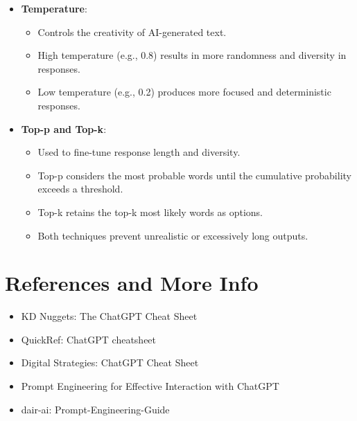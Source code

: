 \begin{itemize}
\itemsep-0.25em %
\item \textbf{Temperature}:
	\begin{itemize}
	\item Controls the creativity of AI-generated text.
	\item High temperature (e.g., 0.8) results in more randomness and diversity in responses.
	\item Low temperature (e.g., 0.2) produces more focused and deterministic responses.
	\end{itemize}
\item \textbf{Top-p and Top-k}:
	\begin{itemize}
	\item Used to fine-tune response length and diversity.
	\item Top-p considers the most probable words until the cumulative probability exceeds a threshold.
	\item Top-k retains the top-k most likely words as options.
	\item Both techniques prevent unrealistic or excessively long outputs.
	\end{itemize}
\end{itemize}

\section{References and More Info}

\begin{itemize}
\itemsep-0.25em %
\item KD Nuggets: The ChatGPT Cheat Sheet
\item QuickRef: ChatGPT cheatsheet
\item Digital Strategies: ChatGPT Cheat Sheet
\item Prompt Engineering for Effective Interaction with ChatGPT
\item dair-ai: Prompt-Engineering-Guide
\end{itemize}